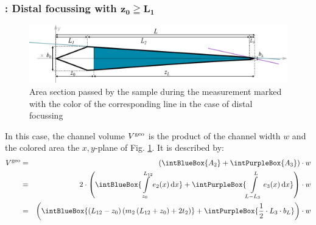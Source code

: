 \subsubsection*{\Vgeo: Distal focussing with $\bm{z_0 \geqq L_1}$}
\begin{figure}[h]
  \begin{center}
    \includegraphics[width=\linewidth]{./images/fffVolume1.pdf}
    \vspace*{-3ex}    
  \end{center}
  \caption[Passed area section - distal focussing]{Area section passed by the sample during the measurement marked with 
  the color of the corresponding line in the case of distal focussing}
  \label{fig:fffVolume1} 
\end{figure}
In this case, the channel volume $V^\text{geo}$ is the product of the channel width $w$ and the colored area the
$x,y$-plane of Fig. \ref{fig:fffVolume1}.
It is described by:
\begin{align}
  \Vgeo & = &\left(\intBlueBox{\ensuremath{A_2}} + \intPurpleBox{\ensuremath{A_3}}\right) \cdot w \nonumber\\  
        & =&2 \cdot \left( 
             \intBlueBox {\ensuremath{ \int\limits_{z_0}^{L_{12}} e_2(x) \diff x }}
             + \intPurpleBox{\ensuremath{  \int\limits_{L-L_3}^{L} e_3(x) \diff x }}    
             \right) \cdot w  \nonumber \\
        &  =&\left(
              \intBlueBox{\ensuremath{ \left( L_{12}-z_0 \right)  \left( m_2 \left(L_{12}+z_0  \right) + 2 t_2  
              \right)  
              }}
              + \intPurpleBox{\ensuremath{ \frac{1}{2} \cdot L_3 \cdot \bL  } }
              \right) \cdot w
\end{align}


